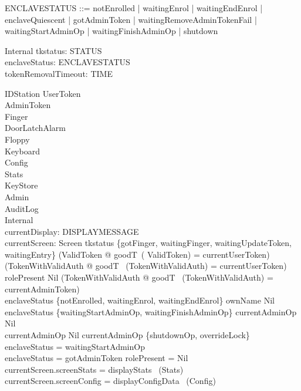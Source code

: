 \begin{zed}
ENCLAVESTATUS ::= notEnrolled | waitingEnrol | waitingEndEnrol | enclaveQuiescent | gotAdminToken | waitingRemoveAdminTokenFail | waitingStartAdminOp | waitingFinishAdminOp | shutdown
\end{zed}

\begin{schema}{Internal}
  tkstatus: STATUS\\
  enclaveStatus: ENCLAVESTATUS\\
  tokenRemovalTimeout: TIME
\end{schema}

\begin{schema}{IDStation}
  UserToken\\
  AdminToken\\
  Finger\\
  DoorLatchAlarm\\
  Floppy\\
  Keyboard\\
  Config\\
  Stats\\
  KeyStore\\
  Admin\\
  AuditLog\\
  Internal\\
  currentDisplay: DISPLAYMESSAGE\\
  currentScreen: Screen
\where
  tkstatus \in  \{gotFinger, waitingFinger, waitingUpdateToken, waitingEntry\} \implies  (\exists  ValidToken @ goodT~( \theta  ValidToken) = currentUserToken) \lor  (\exists  TokenWithValidAuth @ goodT~ (\theta  TokenWithValidAuth) = currentUserToken)\\
  rolePresent \neq  Nil \implies  (\exists  TokenWithValidAuth @ goodT~ (\theta  TokenWithValidAuth) = currentAdminToken)\\
  enclaveStatus \notin  \{notEnrolled, waitingEnrol, waitingEndEnrol\} \implies  ownName \neq  Nil\\
  enclaveStatus \in  \{waitingStartAdminOp, waitingFinishAdminOp\} \iff  currentAdminOp \neq  Nil\\
  currentAdminOp \neq  Nil \land  \The currentAdminOp \in  \{shutdownOp, overrideLock\} \implies  enclaveStatus = waitingStartAdminOp\\
  enclaveStatus = gotAdminToken \implies  rolePresent = Nil\\
  currentScreen.screenStats = displayStats~ (\theta  Stats)\\
  currentScreen.screenConfig = displayConfigData~ (\theta  Config)
\end{schema}

